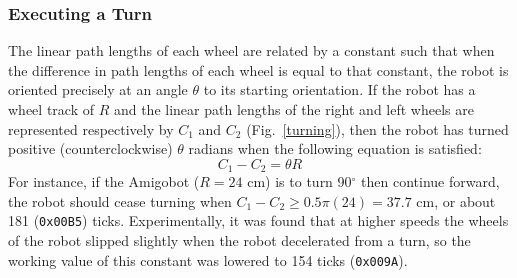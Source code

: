 \subsubsection{Executing a Turn} \label{xturn}
\begin{figure}[h!]
  \centering \cprotect {}
\end{figure}

The linear path lengths of each wheel are related by a constant such
that when the difference in path lengths of each wheel is equal to
that constant, the robot is oriented precisely at an angle \(\theta\)
to its starting orientation. If the robot has a wheel track of \(R\)
and the linear path lengths of the right and left wheels are
represented respectively by \(C_1\) and \(C_2\) (Fig.~\ref{turning}),
then the robot has turned positive (counterclockwise) \(\theta\)
radians when the following equation is satisfied:
\begin{equation}
  C_1 - C_2 = \theta R
\end{equation}
For instance, if the Amigobot (\(R = 24\) cm) is to turn
90\(^\circ\) then continue forward, the robot should cease
turning when \(C_1-C_2 \geq 0.5\pi (24) = 37.7\) cm, or about 181
(\verb+0x00B5+) ticks. Experimentally, it was found that at higher
speeds the wheels of the robot slipped slightly when the robot
decelerated from a turn, so the working
value of this constant was lowered to 154 ticks (\verb+0x009A+).

